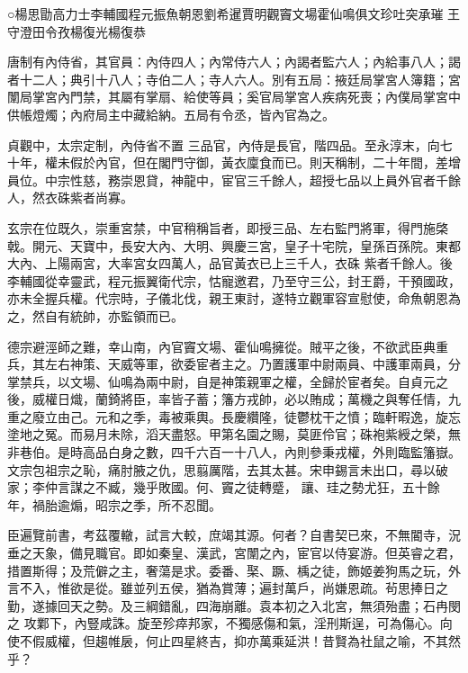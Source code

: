 
\begin{pinyinscope}

 ○楊思勖高力士李輔國程元振魚朝恩劉希暹賈明觀竇文場霍仙鳴俱文珍吐突承璀
 王守澄田令孜楊復光楊復恭



 唐制有內侍省，其官員：內侍四人；內常侍六人；內謁者監六人；內給事八人；謁者十二人；典引十八人；寺伯二人；寺人六人。別有五局：掖廷局掌宮人簿籍；宮闈局掌宮內門禁，其屬有掌扇、給使等員；奚官局掌宮人疾病死喪；內僕局掌宮中供帳燈燭；內府局主中藏給納。五局有令丞，皆內官為之。



 貞觀中，太宗定制，內侍省不置
 三品官，內侍是長官，階四品。至永淳末，向七十年，權未假於內官，但在閣門守御，黃衣廩食而已。則天稱制，二十年間，差增員位。中宗性慈，務崇恩貸，神龍中，宦官三千餘人，超授七品以上員外官者千餘人，然衣硃紫者尚寡。



 玄宗在位既久，崇重宮禁，中官稍稱旨者，即授三品、左右監門將軍，得門施棨戟。開元、天寶中，長安大內、大明、興慶三宮，皇子十宅院，皇孫百孫院。東都大內、上陽兩宮，大率宮女四萬人，品官黃衣已上三千人，衣硃
 紫者千餘人。後李輔國從幸靈武，程元振翼衛代宗，怙寵邀君，乃至守三公，封王爵，干預國政，亦未全握兵權。代宗時，子儀北伐，親王東討，遂特立觀軍容宣慰使，命魚朝恩為之，然自有統帥，亦監領而已。



 德宗避涇師之難，幸山南，內官竇文場、霍仙鳴擁從。賊平之後，不欲武臣典重兵，其左右神策、天威等軍，欲委宦者主之。乃置護軍中尉兩員、中護軍兩員，分掌禁兵，以文場、仙鳴為兩中尉，自是神策親軍之權，全歸於宦者矣。自貞元之
 後，威權日熾，蘭錡將臣，率皆子蓄；籓方戎帥，必以賄成；萬機之與奪任情，九重之廢立由己。元和之季，毒被乘輿。長慶纘隆，徒鬱枕干之憤；臨軒暇逸，旋忘塗地之冤。而易月未除，滔天盡怒。甲第名園之賜，莫匪伶官；硃袍紫綬之榮，無非巷伯。是時高品白身之數，四千六百一十八人，內則參秉戎權，外則臨監籓嶽。文宗包祖宗之恥，痛肘腋之仇，思翦厲階，去其太甚。宋申錫言未出口，尋以破家；李仲言謀之不臧，幾乎敗國。何、竇之徒轉蹙，
 讓、珪之勢尤狂，五十餘年，禍胎逾煽，昭宗之季，所不忍聞。



 臣遍覽前書，考茲覆轍，試言大較，庶竭其源。何者？自書契已來，不無閽寺，況垂之天象，備見職官。即如秦皇、漢武，宮闈之內，宦官以侍宴游。但英睿之君，措置斯得；及荒僻之主，奢蕩是求。委番、棸、蹶、楀之徒，飾姬姜狗馬之玩，外言不入，惟欲是從。雖並列五侯，猶為賞薄；遍封萬戶，尚嫌恩疏。茍思捧日之勤，遂據回天之勢。及三綱錯亂，四海崩離。袁本初之入北宮，無須殆盡；石冉閔之
 攻鄴下，內豎咸誅。旋至殄瘁邦家，不獨感傷和氣，淫刑斯逞，可為傷心。向使不假威權，但趨帷扆，何止四星終吉，抑亦萬乘延洪！昔賢為社鼠之喻，不其然乎？




\end{pinyinscope}

